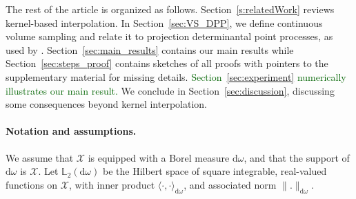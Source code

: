 \documentclass[twoside,11pt]{book}
\newcommand{\rev}[1]{\textcolor{darkgreen}{#1}}
\numberwithin{theorem}{chapter}
\numberwithin{definition}{chapter}
\numberwithin{proposition}{chapter}
\numberwithin{corollary}{chapter}
\numberwithin{example}{chapter}
\numberwithin{lemma}{chapter}
\numberwithin{assumption}{chapter}
\begin{document}

The rest of the article is organized as follows. Section~\ref{s:relatedWork} reviews kernel-based interpolation. In Section~\ref{sec:VS_DPP}, we define continuous volume sampling and relate it to projection determinantal point processes, as used by \cite{BeBaCh19}. Section~\ref{sec:main_results} contains our main results while Section~\ref{sec:steps_proof} contains sketches of all proofs with pointers to the supplementary material for missing details. \rev{Section~\ref{sec:experiment} numerically illustrates our main result.} We conclude in Section~\ref{sec:discussion}, discussing some consequences beyond kernel interpolation.

\paragraph{Notation and assumptions.}\label{CVS_paragraph:notation}
We assume that $\mathcal{X}$ is equipped with a Borel measure $\mathrm{d}\omega$, and that the support of $\mathrm{d}\omega$ is $\mathcal{X}$.
 Let $\mathbb{L}_{2}(\mathrm{d}\omega)$ be the Hilbert space of square integrable, real-valued functions on $\mathcal{X}$, with inner product $\langle \cdot, \cdot \rangle_{\mathrm{d}\omega}$, and associated norm $\|.\|_{\mathrm{d}\omega}$.
%
\end{document}
